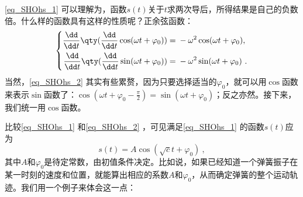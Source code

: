 \autoref{eq_SHOhs_1} 可以理解为，函数$s(t)$关于$t$求两次导后，所得结果是自己的负数倍。什么样的函数具有这样的性质呢？正余弦函数：
\begin{equation}\label{eq_SHOhs_2}
\left\{
\begin{aligned}
    \frac{\dd}{\dd t}\qty(\frac{\dd}{\dd t}\cos(\omega t+\varphi_0)) ={}& -\omega^2\cos(\omega t+\varphi_0), \\
    \frac{\dd}{\dd t}\qty(\frac{\dd}{\dd t}\sin(\omega t+\varphi_0)) ={}& -\omega^2\sin(\omega t+\varphi_0)~. 
\end{aligned}
\right. 
\end{equation}
当然，\autoref{eq_SHOhs_2} 其实有些累赘，因为只要选择适当的$\varphi_0$，就可以用$\cos$函数来表示$\sin$函数了：$\cos(\omega t+\varphi_0-\frac{\pi}{2})=\sin(\omega t+\varphi_0)$；反之亦然。接下来，我们统一用$\cos$函数。

比较\autoref{eq_SHOhs_1} 和\autoref{eq_SHOhs_2} ，可见满足\autoref{eq_SHOhs_1} 的函数$s(t)$应为
\begin{equation}
s(t) = A\cos(\sqrt{c}t+\varphi_0)~,  
\end{equation}
其中$A$和$\varphi_0$是待定常数，由初值条件决定。比如说，如果已经知道一个弹簧振子在某一时刻的速度和位置，就能算出相应的系数$A$和$\varphi_0$，从而确定弹簧的整个运动轨迹。我们用一个例子来体会这一点：



